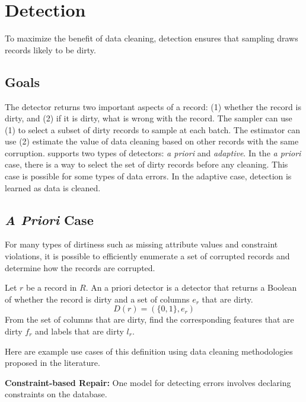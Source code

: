 \section{Detection}\label{det}
To maximize the benefit of data cleaning, detection ensures that sampling draws records likely to be dirty.

\subsection{Goals}
The detector returns two important aspects of a record: (1) whether the record is dirty, and (2) if it is dirty, what is wrong with the record.
The sampler can use (1) to select a subset of dirty records to sample at each batch. 
The estimator can use (2) estimate the value of data cleaning based on other records with the same corruption.
\sys supports two types of detectors: \emph{a priori} and \emph{adaptive}.
In the \emph{a priori} case, there is a way to select the set of dirty records before any cleaning.
This case is possible for some types of data errors.
In the adaptive case, detection is learned as data is cleaned.

\subsection{\protect\textit{\large A Priori} Case}
For many types of dirtiness such as missing attribute values and constraint violations, it is possible to efficiently enumerate a set of corrupted records and determine how the records are corrupted.

\begin{definition}
Let $r$ be a record in $R$. An a priori detector is a detector that returns a Boolean of whether the record is dirty and a set of columns $e_r$ that are dirty.
\[
D(r) = (\{0,1\}, e_r)
\]
From the set of columns that are dirty, find the corresponding features that are dirty $f_r$ and labels that are dirty $l_r$.
\end{definition}

\noindent Here are example use cases of this definition using data cleaning methodologies proposed in the literature.

\vspace{0.5em}

\noindent\textbf{Constraint-based Repair: }
One model for detecting errors involves declaring constraints on the database.

\vspace{0.5em}

